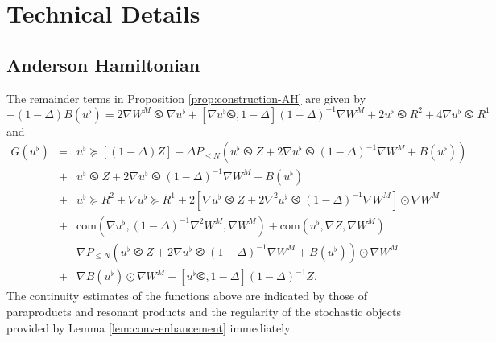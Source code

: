 \chapter{Technical Details}
\section{Anderson Hamiltonian}\label{appendix:AH}

The remainder terms in Proposition \ref{prop:construction-AH} are given by
\begin{equation}
  - (1 - \Delta) B (u^{\flat}) = 2 \nabla W^M \olessthan \nabla u^{\flat} +
  [\nabla u^{\flat} \olessthan, 1 - \Delta] (1 - \Delta)^{- 1} \nabla W^M + 2
  u^{\flat} \olessthan R^2 + 4 \nabla u^{\flat} \olessthan R^1
  \label{eq:def-B}
\end{equation}
and
\begin{eqnarray}
  G (u^{\flat}) & = & u^{\flat} \succcurlyeq [(1 - \Delta) Z] - \Delta
  P_{\leqslant N} (u^{\flat} \olessthan Z + 2 \nabla u^{\flat} \olessthan (1 -
  \Delta)^{- 1} \nabla W^M + B (u^{\flat})) \nonumber\\
  & + & u^{\flat} \olessthan Z + 2 \nabla u^{\flat} \olessthan (1 -
  \Delta)^{- 1} \nabla W^M + B (u^{\flat}) \nonumber\\
  & + & u^{\flat} \succcurlyeq R^2 + \nabla u^{\flat} \succcurlyeq R^1 + 2
  [\nabla u^{\flat} \olessthan Z + 2 \nabla^2 u^{\flat} \olessthan (1 -
  \Delta)^{- 1} \nabla W^M] \odot \nabla W^M \nonumber\\
  & + & \mathrm{com} (\nabla u^{\flat}, (1 - \Delta)^{- 1} \nabla^2 W^M, \nabla
  W^M) + \mathrm{com} (u^{\flat}, \nabla Z, \nabla W^M) \nonumber\\
  & - & \nabla P_{\leqslant N} (u^{\flat} \olessthan Z + 2 \nabla u^{\flat}
  \olessthan (1 - \Delta)^{- 1} \nabla W^M + B (u^{\flat})) \odot \nabla W^M
  \nonumber\\
  & + & \nabla B (u^{\flat}) \odot \nabla W^M + [u^{\flat} \olessthan, 1 -
  \Delta] (1 - \Delta)^{- 1} Z. \label{eq:def-G} 
\end{eqnarray}
The continuity estimates of the functions above are indicated by those of
paraproducts and resonant products and the regularity of the stochastic
objects provided by Lemma \ref{lem:conv-enhancement} immediately.

